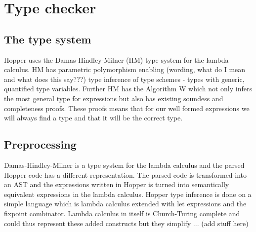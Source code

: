 \section{Type checker}


\subsection{The type system}

Hopper uses the Damas-Hindley-Milner (HM) type system for the lambda calculus. HM has parametric polymorphism enabling (wording, what do I mean and what does this say???) type inference of type schemes - types with generic, quantified type variables. Further HM has the Algorithm W which not only infers the most general type for expressions but also has existing soundess and completeness proofs. These proofs means that for our well formed expressions we will always find a type and that it will be the correct type.

\subsection{Preprocessing}

Damas-Hindley-Milner is a type system for the lambda calculus and the parsed Hopper code has a different representation. The parsed code is transformed into an AST and the expressions written in Hopper is turned into semantically equivalent expressions in the lambda calculus. Hopper type inference is done on a simple language which is lambda calculus extended with let expressions and the fixpoint combinator. Lambda calculus in itself is Church-Turing complete and could thus represent these added constructs but they simplify ... (add stuff here)

